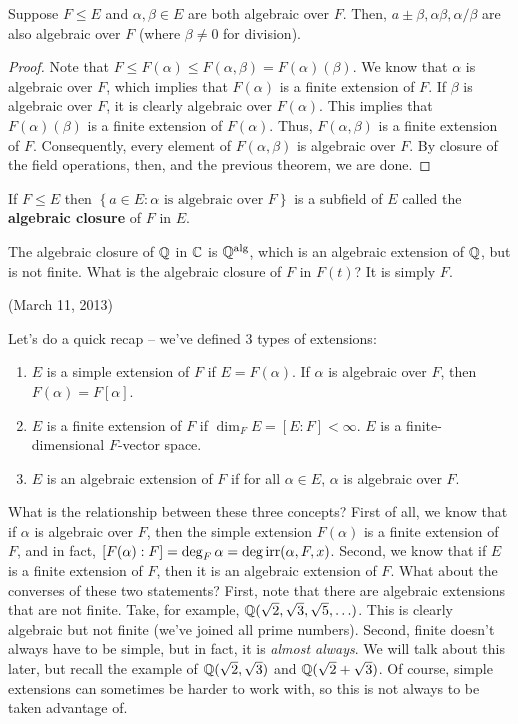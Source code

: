\documentclass{../mathnotes}
\begin{document}
\begin{thm}
    Suppose $F\leq E$ and $\alpha,\beta\in E$ are both algebraic over $F$. Then, $a\pm \beta, \alpha\beta, \alpha/\beta$
    are also algebraic over $F$ (where $\beta\neq 0$ for division).
\end{thm}
\begin{proof}
    Note that $F\leq F(\alpha)\leq F(\alpha,\beta)=F(\alpha)(\beta)$. We know that $\alpha$ is algebraic over $F$, which
    implies that $F(\alpha)$ is a finite extension of $F$. If $\beta$ is algebraic over $F$, it is clearly algebraic over $F(\alpha)$.
    This implies that $F(\alpha)(\beta)$ is a finite extension of $F(\alpha)$. Thus, $F(\alpha,\beta)$ is a finite extension of $F$.
    Consequently, every element of $F(\alpha,\beta)$ is algebraic over $F$. By closure of the field operations, then, and the previous theorem,
    we are done.
\end{proof}

\begin{cor}
    If $F\leq E$ then $\left\{ a\in E:\alpha\text{ is algebraic over }F \right\}$ is a subfield of $E$ called the \textbf{algebraic closure} of
    $F$ in $E$.
\end{cor}

\begin{exmp}
    The algebraic closure of $\mathbb{Q}$ in $\mathbb{C}$ is $\mathbb{Q}^{\rm alg}$, which is an algebraic extension of $\mathbb{Q}$, but is not finite.
    What is the algebraic closure of $F$ in $F(t)$? It is simply $F$.
\end{exmp}


(March 11, 2013)

Let's do a quick recap -- we've defined 3 types of extensions:
\begin{enumerate}
    \item $E$ is a simple extension of $F$ if $E=F(\alpha)$. If $\alpha$ is algebraic over $F$, then $F(\alpha)=F[\alpha]$.
    \item $E$ is a finite extension of $F$ if $\dim_FE=[E:F]<\infty$. $E$ is a finite-dimensional $F$-vector space.
    \item $E$ is an algebraic extension of $F$ if for all $\alpha\in E$, $\alpha$ is algebraic over $F$.
\end{enumerate}

What is the relationship between these three concepts? First of all, we know that if $\alpha$ is algebraic over $F$, then
the simple extension $F(\alpha)$ is a finite extension of $F$, and in fact, $[F(\alpha):F]=\deg_F\alpha=\deg\operatorname{irr}(\alpha,F,x)$. 
Second, we know that if $E$ is a finite extension of $F$, then it is an algebraic extension of $F$. What about the converses of
these two statements? First, note that there are algebraic extensions that are not finite. Take, for example, $\mathbb{Q}(\sqrt{2},\sqrt{3},\sqrt{5},\ldots)$.
This is clearly algebraic but not finite (we've joined all prime numbers). Second, finite doesn't always have to be simple, but in fact,
it is \textit{almost always}. We will talk about this later, but recall the example of $\mathbb{Q}(\sqrt{2},\sqrt{3})$ and $\mathbb{Q}(\sqrt{2}+\sqrt{3})$.
Of course, simple extensions can sometimes be harder to work with, so this is not always to be taken advantage of.
\end{document}
